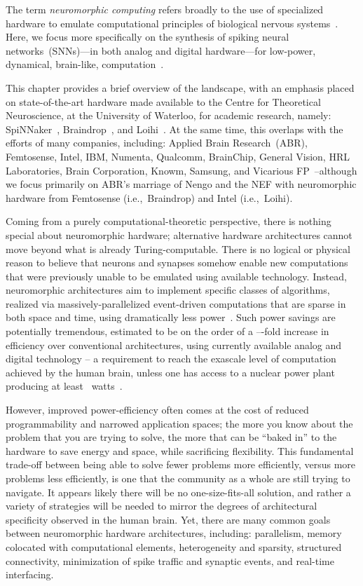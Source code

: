 The term \emph{neuromorphic computing} refers broadly to the use of specialized hardware to emulate computational principles of biological nervous systems~\citep{mead1989analog, liu2002analog}.
Here, we focus more specifically on the synthesis of spiking neural networks~(SNNs)---in both analog and digital hardware---for low-power, dynamical, brain-like, computation~\citep{boahen2017neuromorph}.

This chapter provides a brief overview of the landscape, with an emphasis placed on state-of-the-art hardware made available to the Centre for Theoretical Neuroscience, at the University of Waterloo, for academic research, namely: SpiNNaker~\citep{furber2014spinnaker}, Braindrop~\citep{braindrop2019}, and Loihi~\citep{davies2018loihi}.
At the same time, this overlaps with the efforts of many companies, including: Applied Brain Research~(ABR), Femtosense, Intel, IBM, Numenta, Qualcomm, BrainChip, General Vision, HRL Laboratories, Brain Corporation, Knowm, Samsung, and Vicarious FP~\citep{marketreport2018, femtosense}--although we focus primarily on ABR's marriage of Nengo and the NEF with neuromorphic hardware from Femtosense (i.e.,~Braindrop) and Intel (i.e.,~Loihi).

Coming from a purely computational-theoretic perspective, there is nothing special about neuromorphic hardware; alternative hardware architectures cannot move beyond what is already Turing-computable.
There is no logical or physical reason to believe that neurons and synapses somehow enable new computations that were previously unable to be emulated using available technology.
Instead, neuromorphic architectures aim to implement specific classes of algorithms, realized via massively-parallelized event-driven computations that are sparse in both space and time, using dramatically less power~\citep{tang2017sparse}.
Such power savings are potentially tremendous, estimated to be on the order of a ---fold increase in efficiency over conventional architectures, using currently available analog and digital technology -- a requirement to reach the exascale level of computation achieved by the human brain, unless one has access to a nuclear power plant producing at least \ watts~\citep{furber2012build}.

However, improved power-efficiency often comes at the cost of reduced programmability and narrowed application spaces;
the more you know about the problem that you are trying to solve, the more that can be ``baked in'' to the hardware to save energy and space, while sacrificing flexibility.
This fundamental trade-off between being able to solve fewer problems more efficiently, versus more problems less efficiently, is one that the community as a whole are still trying to navigate.
It appears likely there will be no one-size-fits-all solution, and rather a variety of strategies will be needed to mirror the degrees of architectural specificity observed in the human brain.
Yet, there are many common goals between neuromorphic hardware architectures, including: parallelism, memory colocated with computational elements, heterogeneity and sparsity, structured connectivity, minimization of spike traffic and synaptic events, and real-time interfacing.

